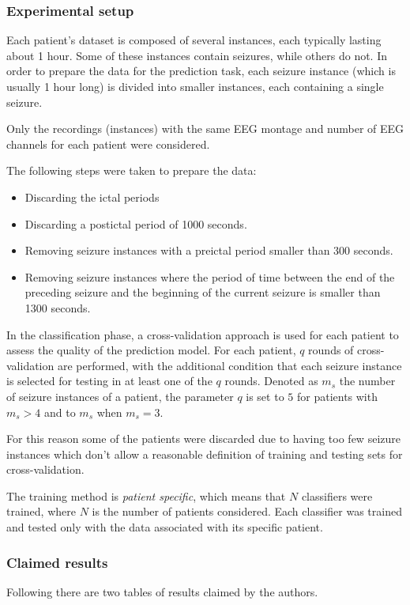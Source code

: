 \subsubsection{Experimental setup} \label{subsub:refwork-siena-exp}
Each patient's dataset is composed of several instances, each typically lasting about 1 hour. Some of these instances contain seizures, while others do not. In order to prepare the data for the prediction task, each seizure instance (which is usually 1 hour long) is divided into smaller instances, each containing a single seizure. 

Only the recordings (instances) with the same \gls{EEG} montage and number of EEG channels for each patient were considered.

The following steps were taken to prepare the data:
\begin{itemize}
    \item Discarding the ictal periods
    \item Discarding a postictal period of 1000 seconds.
    \item Removing seizure instances with a preictal period smaller than 300 seconds.
    \item Removing seizure instances where the period of time between the end of the preceding seizure and the beginning of the current seizure is smaller than 1300 seconds.
\end{itemize}

In the classification phase, a cross-validation approach is used for each patient to assess the quality of the prediction model.
For each patient, $q$ rounds of cross-validation are performed, with the additional condition that each seizure instance is selected for testing in at least one of the $q$ rounds. Denoted as $m_s$ the number of seizure instances of a patient, the parameter $q$ is set to $5$ for patients with $m_s > 4$ and to $m_s$ when $m_s = 3$.

For this reason some of the patients were discarded due to having too few seizure instances which don't allow a reasonable definition of training and testing sets for cross-validation.

The training method is \textit{patient specific}, which means that $N$ classifiers were trained, where $N$ is the number of patients considered. Each classifier was trained and tested only with the data associated with its specific patient.

\subsubsection{Claimed results} \label{subsub:refwork-siena-results}
Following there are two tables of results claimed by the authors.

